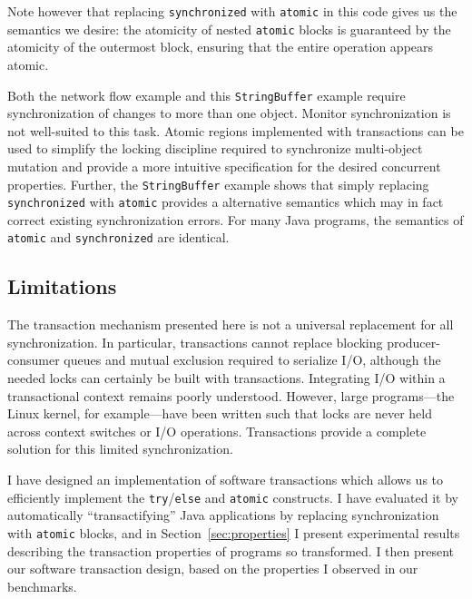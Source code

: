 \documentclass[12pt,oneside]{article}
\newcommand{\note}[1]{}%
\newcommand{\punt}[1]{}%
\newcommand{\subsecput}[2]{\subsection{#2}\label{sec:#1}}
\newcommand{\secref}[1]         {Section~\ref{sec:#1}}
\begin{document}
Note however that replacing {\tt synchronized} with {\tt atomic} in
this code gives us the semantics
we desire: the atomicity of nested {\tt atomic} blocks is guaranteed
by the atomicity of the outermost block, ensuring that the entire
operation appears atomic.

Both the network flow example and this {\tt StringBuffer} example require
synchronization of
changes to more than one object.
Monitor synchronization is not
well-suited to this task.  Atomic regions implemented with
transactions can be used to simplify the locking discipline required
to synchronize multi-object mutation
and provide a more intuitive specification for the desired
concurrent properties.  Further, the {\tt StringBuffer} example shows
that simply replacing {\tt synchronized} with {\tt atomic} provides a
alternative semantics which may in fact correct existing
synchronization errors.
For many Java programs, the
semantics of {\tt atomic} and {\tt synchronized} are identical.
\note{Can I make this rigorous?}

\subsecput{xlimit}{Limitations}
The transaction mechanism presented here is not a universal
replacement for all synchronization.  In particular, transactions
cannot replace blocking producer-consumer queues and mutual exclusion
required to serialize I/O, although the needed locks can certainly be
built with transactions.  Integrating I/O within a transactional
context remains poorly understood.  However, large programs---the
Linux kernel, for example---have been written such that locks are
never held across context switches or I/O operations.  Transactions
provide a complete solution for this limited synchronization.

\vspace*{5mm}
I have designed an implementation of software transactions which allows
us to efficiently implement the {\tt try}/{\tt else} and {\tt atomic}
constructs.  I have evaluated it by automatically
``transactifying'' Java applications by replacing synchronization with
{\tt atomic} blocks, and in \secref{properties} I present
experimental results describing the
transaction properties of programs so transformed.
I then present our software transaction design, based on the
properties I observed in our benchmarks.
\punt{
I present modelling results affirming the correctness of the design, and compiler
optimizations to enhance its performance.  I also describe a variant
on the scheme which uses some hardware support.  Finally, I present
performance data for our pure-software and partially-hardware
transaction implementations.
}
\end{document}
